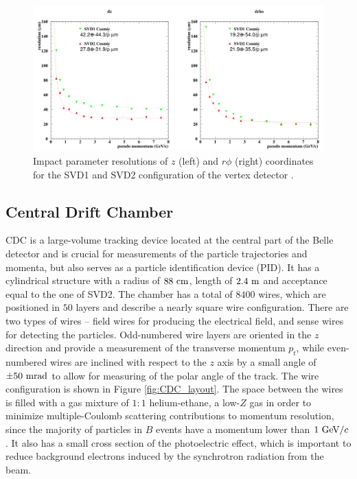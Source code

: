 \begin{figure}[H]
	\centering
	\captionsetup{width=0.8\linewidth}
	\includegraphics[width=\linewidth]{fig/setup/SVD_performance_1}
	\caption{Impact parameter resolutions of $z$ (left) and $r\phi$ (right) coordinates for the SVD1 and SVD2 configuration of the vertex detector \cite{haba2004letter}.}
	\label{fig:SVD_performance}
\end{figure}


\subsection{Central Drift Chamber}

CDC is a large-volume tracking device located at the central part of the Belle detector and is crucial for measurements of the particle trajectories and momenta, but also serves as a particle identification device (PID). It has a cylindrical structure with a radius of $88\mathrm{~cm}$, length of $2.4\mathrm{~m}$ and acceptance equal to the one of SVD2. The chamber has a total of $8400$ wires, which are positioned in $50$ layers and describe a nearly square wire configuration. There are two types of wires -- field wires for producing the electrical field, and sense wires for detecting the particles. Odd-numbered wire layers are oriented in the $z$ direction and provide a measurement of the transverse momentum $p_t$, while even-numbered wires are inclined with respect to the $z$ axis by a small angle of $\pm 50\mathrm{~mrad}$ to allow for measuring of the polar angle of the track. The wire configuration is shown in Figure \ref{fig:CDC_layout}. The space between the wires is filled with a gas mixture of $1:1$ helium-ethane, a low-$Z$ gas in order to minimize multiple-Coulomb scattering contributions to momentum resolution, since the majority of particles in $B$ events have a momentum lower than $1\mathrm{~GeV}/c$. It also has a small cross section of the photoelectric effect, which is important to reduce background electrons induced by the synchrotron radiation from the beam. 


